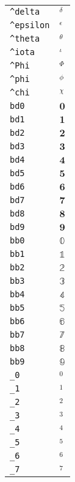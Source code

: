 \begin{longtable}{ll}
\texttt{\textasciicircum delta}&${}^\delta {}$\\
\texttt{\textasciicircum epsilon}&${}^\epsilon {}$\\
\texttt{\textasciicircum theta}&${}^\theta {}$\\
\texttt{\textasciicircum iota}&${}^\iota {}$\\
\texttt{\textasciicircum Phi}&${}^\Phi {}$\\
\texttt{\textasciicircum phi}&${}^\phi {}$\\
\texttt{\textasciicircum chi}&${}^\chi {}$\\
\texttt{bd0}&${}{\textbf{0}}{}$\\
\texttt{bd1}&${}{\textbf{1}}{}$\\
\texttt{bd2}&${}{\textbf{2}}{}$\\
\texttt{bd3}&${}{\textbf{3}}{}$\\
\texttt{bd4}&${}{\textbf{4}}{}$\\
\texttt{bd5}&${}{\textbf{5}}{}$\\
\texttt{bd6}&${}{\textbf{6}}{}$\\
\texttt{bd7}&${}{\textbf{7}}{}$\\
\texttt{bd8}&${}{\textbf{8}}{}$\\
\texttt{bd9}&${}{\textbf{9}}{}$\\
\texttt{bb0}&${}{\mathbb{0}}{}$\\
\texttt{bb1}&${}{\mathbb{1}}{}$\\
\texttt{bb2}&${}{\mathbb{2}}{}$\\
\texttt{bb3}&${}{\mathbb{3}}{}$\\
\texttt{bb4}&${}{\mathbb{4}}{}$\\
\texttt{bb5}&${}{\mathbb{5}}{}$\\
\texttt{bb6}&${}{\mathbb{6}}{}$\\
\texttt{bb7}&${}{\mathbb{7}}{}$\\
\texttt{bb8}&${}{\mathbb{8}}{}$\\
\texttt{bb9}&${}{\mathbb{9}}{}$\\
\texttt{\_0}&${}_0 {}$\\
\texttt{\_1}&${}_1 {}$\\
\texttt{\_2}&${}_2 {}$\\
\texttt{\_3}&${}_3 {}$\\
\texttt{\_4}&${}_4 {}$\\
\texttt{\_5}&${}_5 {}$\\
\texttt{\_6}&${}_6 {}$\\
\texttt{\_7}&${}_7 {}$\\

\end{longtable}

